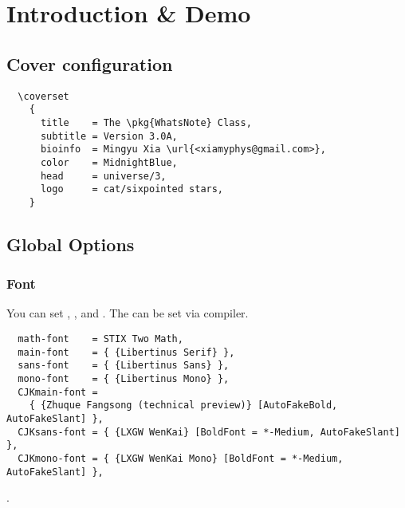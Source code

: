 \documentclass[twoside]{whatsnote}
\providecommand\pkg{\textsf}
\providecommand\url{\texttt}
\begin{document}
\maketitle

\chapter { Introduction \& Demo }

\section{Cover configuration}

\begin{framed}
  \begin{verbatim}
  \coverset
    {
      title    = The \pkg{WhatsNote} Class,
      subtitle = Version 3.0A,
      bioinfo  = Mingyu Xia \url{<xiamyphys@gmail.com>},
      color    = MidnightBlue,
      head     = universe/3,
      logo     = cat/sixpointed stars,
    }
  \end{verbatim}
\end{framed}

\section{Global Options}

\subsection{Font}

You can set , ,
 and .
The  can be set via  compiler.

\begin{verbatim}
  math-font    = STIX Two Math,
  main-font    = { {Libertinus Serif} },
  sans-font    = { {Libertinus Sans} },
  mono-font    = { {Libertinus Mono} },
  CJKmain-font =
    { {Zhuque Fangsong (technical preview)} [AutoFakeBold, AutoFakeSlant] },
  CJKsans-font = { {LXGW WenKai} [BoldFont = *-Medium, AutoFakeSlant] },
  CJKmono-font = { {LXGW WenKai Mono} [BoldFont = *-Medium, AutoFakeSlant] },
\end{verbatim}

\scratch
\begin{solution}
  \lipsum [ 2 ]
  .
\end{solution}
\end{document}
